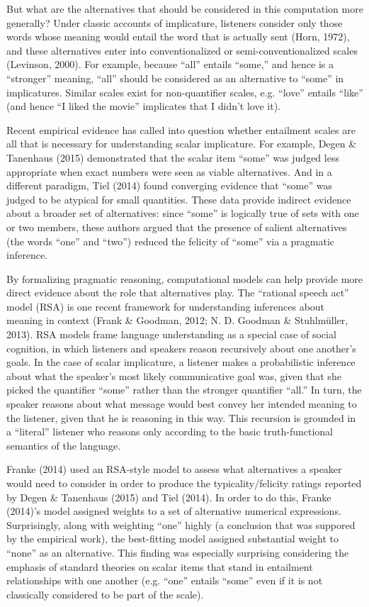 \documentclass[10pt, letterpaper]{article}
\begin{document}
But what are the alternatives that should be considered in this
computation more generally? Under classic accounts of implicature,
listeners consider only those words whose meaning would entail the word
that is actually sent (Horn, 1972), and these alternatives enter into
conventionalized or semi-conventionalized scales (Levinson, 2000). For
example, because ``all'' entails ``some,'' and hence is a ``stronger''
meaning, ``all'' should be considered as an alternative to ``some'' in
implicatures. Similar scales exist for non-quantifier scales, e.g.
``love'' entails ``like'' (and hence ``I liked the movie'' implicates
that I didn't love it).

Recent empirical evidence has called into question whether entailment
scales are all that is necessary for understanding scalar implicature.
For example, Degen \& Tanenhaus (2015) demonstrated that the scalar item
``some'' was judged less appropriate when exact numbers were seen as
viable alternatives. And in a different paradigm, Tiel (2014) found
converging evidence that ``some'' was judged to be atypical for small
quantities. These data provide indirect evidence about a broader set of
alternatives: since ``some'' is logically true of sets with one or two
members, these authors argued that the presence of salient alternatives
(the words ``one'' and ``two'') reduced the felicity of ``some'' via a
pragmatic inference.

By formalizing pragmatic reasoning, computational models can help
provide more direct evidence about the role that alternatives play. The
``rational speech act'' model (RSA) is one recent framework for
understanding inferences about meaning in context (Frank \& Goodman,
2012; N. D. Goodman \& Stuhlm{ü}ller, 2013). RSA models frame language
understanding as a special case of social cognition, in which listeners
and speakers reason recursively about one another's goals. In the case
of scalar implicature, a listener makes a probabilistic inference about
what the speaker's most likely communicative goal was, given that she
picked the quantifier ``some'' rather than the stronger quantifier
``all.'' In turn, the speaker reasons about what message would best
convey her intended meaning to the listener, given that he is reasoning
in this way. This recursion is grounded in a ``literal'' listener who
reasons only according to the basic truth-functional semantics of the
language.

Franke (2014) used an RSA-style model to assess what alternatives a
speaker would need to consider in order to produce the
typicality/felicity ratings reported by Degen \& Tanenhaus (2015) and
Tiel (2014). In order to do this, Franke (2014)'s model assigned weights
to a set of alternative numerical expressions. Surprisingly, along with
weighting ``one'' highly (a conclusion that was suppored by the
empirical work), the best-fitting model assigned substantial weight to
``none'' as an alternative. This finding was especially surprising
considering the emphasis of standard theories on scalar items that stand
in entailment relationships with one another (e.g. ``one'' entails
``some'' even if it is not classically considered to be part of the
scale).
\end{document}
